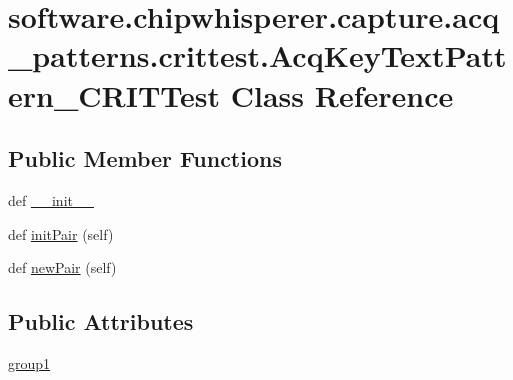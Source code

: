 \hypertarget{classsoftware_1_1chipwhisperer_1_1capture_1_1acq__patterns_1_1crittest_1_1AcqKeyTextPattern__CRITTest}{}\section{software.\+chipwhisperer.\+capture.\+acq\+\_\+patterns.\+crittest.\+Acq\+Key\+Text\+Pattern\+\_\+\+C\+R\+I\+T\+Test Class Reference}
\label{classsoftware_1_1chipwhisperer_1_1capture_1_1acq__patterns_1_1crittest_1_1AcqKeyTextPattern__CRITTest}
\subsection*{Public Member Functions}
\begin{DoxyCompactItemize}
\item 
def \hyperlink{classsoftware_1_1chipwhisperer_1_1capture_1_1acq__patterns_1_1crittest_1_1AcqKeyTextPattern__CRITTest_a6461244ec50416885e20cb90d13e6372}{\+\_\+\+\_\+init\+\_\+\+\_\+}
\item 
def \hyperlink{classsoftware_1_1chipwhisperer_1_1capture_1_1acq__patterns_1_1crittest_1_1AcqKeyTextPattern__CRITTest_aedc1fa4dfcaab30960cd70efcd2da330}{init\+Pair} (self)
\item 
def \hyperlink{classsoftware_1_1chipwhisperer_1_1capture_1_1acq__patterns_1_1crittest_1_1AcqKeyTextPattern__CRITTest_a4998f7c6fc10afad2a7e967e64a2ceb4}{new\+Pair} (self)
\end{DoxyCompactItemize}
\subsection*{Public Attributes}
\begin{DoxyCompactItemize}
\item 
\hyperlink{classsoftware_1_1chipwhisperer_1_1capture_1_1acq__patterns_1_1crittest_1_1AcqKeyTextPattern__CRITTest_a525ee1e4b14715e6e00e7d26653ea5c9}{group1}
\end{DoxyCompactItemize}


